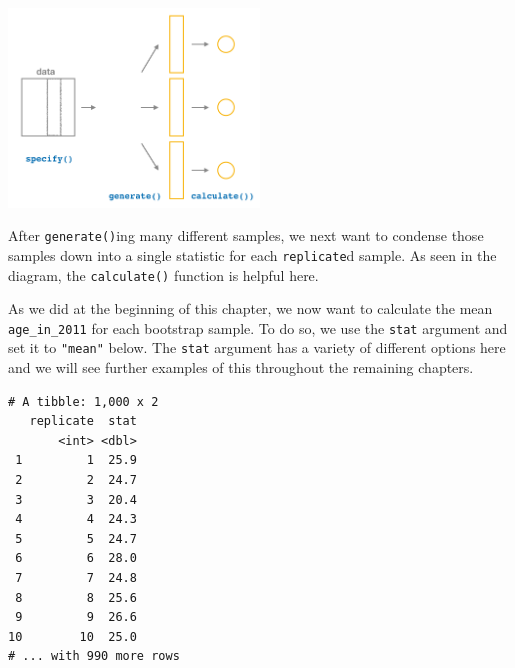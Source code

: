 \documentclass[]{article}
\newenvironment{Shaded}{\begin{snugshade}}{\end{snugshade}}
\newcommand{\KeywordTok}[1]{\textcolor[rgb]{0.13,0.29,0.53}{\textbf{#1}}}
\newcommand{\DataTypeTok}[1]{\textcolor[rgb]{0.13,0.29,0.53}{#1}}
\newcommand{\DecValTok}[1]{\textcolor[rgb]{0.00,0.00,0.81}{#1}}
\newcommand{\StringTok}[1]{\textcolor[rgb]{0.31,0.60,0.02}{#1}}
\newcommand{\OperatorTok}[1]{\textcolor[rgb]{0.81,0.36,0.00}{\textbf{#1}}}
\newcommand{\NormalTok}[1]{#1}
\begin{document}
\begin{center}
\includegraphics[width=0.5\textwidth]{calculate.png}
\end{center}

After \texttt{generate()}ing many different samples, we next want to
condense those samples down into a single statistic for each
\texttt{replicate}d sample. As seen in the diagram, the
\texttt{calculate()} function is helpful here.

As we did at the beginning of this chapter, we now want to calculate the
mean \texttt{age\_in\_2011} for each bootstrap sample. To do so, we use
the \texttt{stat} argument and set it to \texttt{"mean"} below. The
\texttt{stat} argument has a variety of different options here and we
will see further examples of this throughout the remaining chapters.

\begin{Shaded}
\end{Shaded}

\begin{verbatim}
# A tibble: 1,000 x 2
   replicate  stat
       <int> <dbl>
 1         1  25.9
 2         2  24.7
 3         3  20.4
 4         4  24.3
 5         5  24.7
 6         6  28.0
 7         7  24.8
 8         8  25.6
 9         9  26.6
10        10  25.0
# ... with 990 more rows
\end{verbatim}
\end{document}
